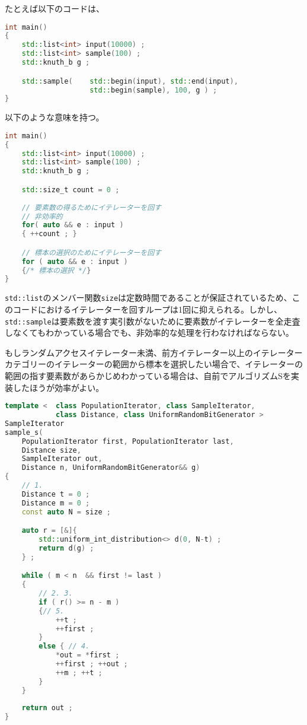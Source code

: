 たとえば以下のコードは、
\begin{lstlisting}[language=C++]
int main()
{
    std::list<int> input(10000) ;
    std::list<int> sample(100) ;
    std::knuth_b g ;

    std::sample(    std::begin(input), std::end(input),
                    std::begin(sample), 100, g ) ;
}
\end{lstlisting}
以下のような意味を持つ。
\begin{lstlisting}[language=C++]
int main()
{
    std::list<int> input(10000) ;
    std::list<int> sample(100) ;
    std::knuth_b g ;

    std::size_t count = 0 ;
    
    // 要素数の得るためにイテレーターを回す
    // 非効率的
    for( auto && e : input )
    { ++count ; }

    // 標本の選択のためにイテレーターを回す
    for ( auto && e : input )
    {/* 標本の選択 */}
}
\end{lstlisting}

\lstinline!std::list!のメンバー関数\lstinline!size!は定数時間であることが保証されているため、このコードにおけるイテレーターを回すループは1回に抑えられる。しかし、\lstinline!std::sample!は要素数を渡す実引数がないために要素数がイテレーターを全走査しなくてもわかっている場合でも、非効率的な処理を行わなければならない。

もしランダムアクセスイテレーター未満、前方イテレーター以上のイテレーターカテゴリーのイテレーターの範囲から標本を選択したい場合で、イテレーターの範囲の指す要素数があらかじめわかっている場合は、自前でアルゴリズムSを実装したほうが効率がよい。

\begin{lstlisting}[language=C++]
template <  class PopulationIterator, class SampleIterator,
            class Distance, class UniformRandomBitGenerator >
SampleIterator
sample_s(
    PopulationIterator first, PopulationIterator last,
    Distance size,
    SampleIterator out,
    Distance n, UniformRandomBitGenerator&& g)
{
    // 1.
    Distance t = 0 ;
    Distance m = 0 ;
    const auto N = size ;

    auto r = [&]{
        std::uniform_int_distribution<> d(0, N-t) ;
        return d(g) ;
    } ;

    while ( m < n  && first != last )
    {
        // 2. 3.
        if ( r() >= n - m )
        {// 5.
            ++t ;
            ++first ;
        }
        else { // 4.
            *out = *first ;
            ++first ; ++out ;
            ++m ; ++t ;
        }
    }
    
    return out ;
}
\end{lstlisting}

